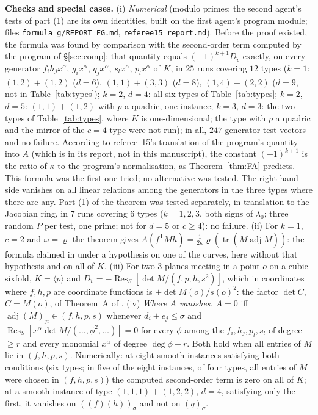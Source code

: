 \documentclass[11pt]{article}
\numberwithin{equation}{section}
\theoremstyle{remark}
\newcommand{\Res}{\operatorname{Res}}
\newcommand{\T}{\mathsf{T}}
\newcommand{\lz}{\lambda_0}
\newcommand{\run}[1]{\medskip\noindent\textbf{#1}}
\begin{document}
\run{Checks and special cases.} (i) \emph{Numerical} (modulo primes; the second agent's tests of part (1) are
its own identities, built on the first agent's program module; files
\texttt{formula\_g/REPORT\_FG.md}, \texttt{referee15\_report.md}). Before the proof existed, the formula was found
by comparison with the second-order term computed by the program of \S\ref{sec:comp}: that quantity equals
$(-1)^{k+1}D_{\dot v}$ exactly, on every generator $f_ih_jx^\alpha$, $g_ix^\alpha$, $q_jx^\alpha$, $s_lx^\alpha$,
$p_lx^\alpha$ of $K$, in $25$ runs covering $12$ types ($k=1$: $(1,2)+(1,2)$ ($d=6$), $(1,1)+(3,3)$ ($d=8$), $(1,4)+(2,2)$ ($d=9$, not in Table~\ref{tab:types}); $k=2$,
$d=4$: all six types of Table~\ref{tab:types}; $k=2$, $d=5$: $(1,1)+(1,2)$ with $p$ a quadric, one instance;
$k=3$, $d=3$: the two types of Table~\ref{tab:types}, where $K$ is one-dimensional; the type with $p$ a quadric
and the mirror of the $c=4$ type were not run); in all, $247$ generator test vectors and no failure. According
to referee~15's translation of the program's quantity into $A$ (which is in its report, not in this manuscript),
the constant $(-1)^{k+1}$ is the ratio of $\kappa$ to the program's normalisation, as Theorem~\ref{thm:FA}
predicts. This formula was the first one tried; no alternative was tested. The right-hand side vanishes on all linear relations among the generators in the three types
where there are any. Part (1) of the theorem was tested separately, in translation to the Jacobian ring, in $7$
runs covering $6$ types ($k=1,2,3$, both signs of $\lz$; three random $P$ per test, one prime; not for $d=5$ or
$c\ge4$): no failure. (ii) For $k=1$, $c=2$ and $\omega=\varrho$
the theorem gives $A(f^\T\dot Mh)=\frac1{2\kappa}\varrho(\operatorname{tr}(\dot M\operatorname{adj}M))$: the formula
claimed in \cite{P2} under a hypothesis on one of the curves, here without that hypothesis and on
all of $K$.
(iii) For two $3$-planes meeting in a point $o$ on a cubic sixfold, $K=\langle p\rangle$ and
$D_{\dot v}=-\Res_S[\det M/(f,p;h,s^2)]$, which in coordinates where $f,h,p$ are coordinate functions is
$\pm\det M(o)/s(o)^2$: the factor $\det C$, $C=M(o)$, of Theorem~A of \cite{P1}. (iv) \emph{Where $A$ vanishes.}
$A=0$ iff $\operatorname{adj}(M)_{ji}\in(f,h,p,s)$ whenever $d_i+e_j\le\sigma$ and
$\Res_S[x^\alpha\det M/(\dots,\phi^2,\dots)]=0$ for every $\phi$ among the $f_i,h_j,p_l,s_l$ of degree $\ge r$ and every
monomial $x^\alpha$ of degree $\deg\phi-r$. Both hold when all entries of $M$ lie in $(f,h,p,s)$. Numerically: at
eight smooth instances satisfying both conditions (six types; in five of the eight instances, of four types,
all entries of $M$ were chosen in $(f,h,p,s)$) the computed second-order term is zero on all of $K$; at a smooth instance of type
$(1,1,1)+(1,2,2)$, $d=4$, satisfying only the first, it vanishes on $((f)(h))_\sigma$ and not on $(q)_\sigma$.
\end{document}

